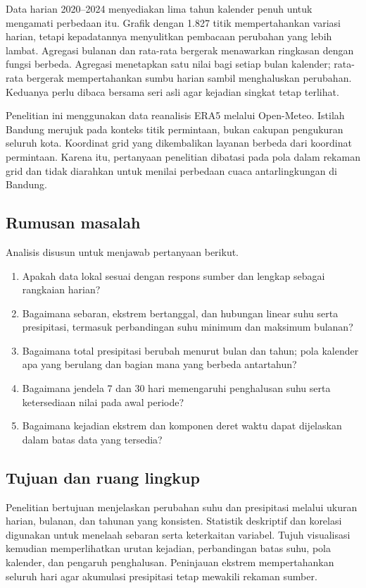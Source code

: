 \documentclass[12pt,a4paper]{article}
\begin{document}
Data harian 2020--2024 menyediakan lima tahun kalender penuh untuk mengamati perbedaan itu. Grafik dengan 1.827 titik mempertahankan variasi harian, tetapi kepadatannya menyulitkan pembacaan perubahan yang lebih lambat. Agregasi bulanan dan rata-rata bergerak menawarkan ringkasan dengan fungsi berbeda. Agregasi menetapkan satu nilai bagi setiap bulan kalender; rata-rata bergerak mempertahankan sumbu harian sambil menghaluskan perubahan. Keduanya perlu dibaca bersama seri asli agar kejadian singkat tetap terlihat.

Penelitian ini menggunakan data reanalisis ERA5 melalui Open-Meteo. Istilah Bandung merujuk pada konteks titik permintaan, bukan cakupan pengukuran seluruh kota. Koordinat grid yang dikembalikan layanan berbeda dari koordinat permintaan. Karena itu, pertanyaan penelitian dibatasi pada pola dalam rekaman grid dan tidak diarahkan untuk menilai perbedaan cuaca antarlingkungan di Bandung.

\subsection{Rumusan masalah}
Analisis disusun untuk menjawab pertanyaan berikut.
\begin{enumerate}
\item Apakah data lokal sesuai dengan respons sumber dan lengkap sebagai rangkaian harian?
\item Bagaimana sebaran, ekstrem bertanggal, dan hubungan linear suhu serta presipitasi, termasuk perbandingan suhu minimum dan maksimum bulanan?
\item Bagaimana total presipitasi berubah menurut bulan dan tahun; pola kalender apa yang berulang dan bagian mana yang berbeda antartahun?
\item Bagaimana jendela 7 dan 30 hari memengaruhi penghalusan suhu serta ketersediaan nilai pada awal periode?
\item Bagaimana kejadian ekstrem dan komponen deret waktu dapat dijelaskan dalam batas data yang tersedia?
\end{enumerate}

\subsection{Tujuan dan ruang lingkup}
Penelitian bertujuan menjelaskan perubahan suhu dan presipitasi melalui ukuran harian, bulanan, dan tahunan yang konsisten. Statistik deskriptif dan korelasi digunakan untuk menelaah sebaran serta keterkaitan variabel. Tujuh visualisasi kemudian memperlihatkan urutan kejadian, perbandingan batas suhu, pola kalender, dan pengaruh penghalusan. Peninjauan ekstrem mempertahankan seluruh hari agar akumulasi presipitasi tetap mewakili rekaman sumber.
\end{document}

